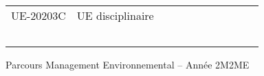 \documentclass[a4paper,11pt]{article}
\begin{document}
{{\begin{tabular}{lllllllllll}
\rowcolor[HTML]{C0C0C0} 
UE-20203C                      & UE disciplinaire                                   &                           &                           &                           &                                    &                             &                             &                                    &                                  &                                  \\
                               &                                                    &                           &                           &                           &                                    &                             &                             &                                    &                                  &                                  \\
                               &                                                    &                           &                           &                           &                                    &                             &                             &                                    &                                  &                                  \\
                               &                                                    &                           &                           &                           &                                    &                             &                             &                                    &                                  &                                  \\
                               &                                                    &                           &                           &                           &                                    &                             &                             &                                    &                                  &                                  \\
                               &                                                    &                           &                           &                           &                                    &                             &                             &                                    &                                  &                                 
\end{tabular}
}
}{Parcours Management Environnemental -- Année 2}{M2ME}
\end{document}
